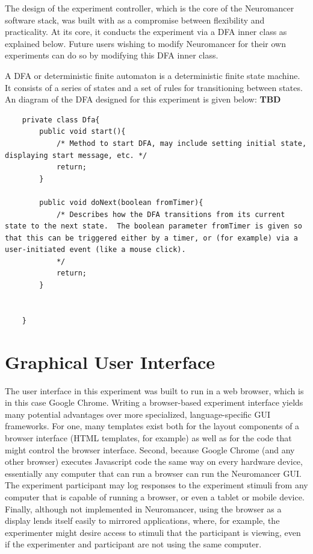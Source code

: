\documentclass[12pt]{report}
\begin{document}
The design of the experiment controller, which is the core of the Neuromancer software stack, was built with as a compromise between flexibility and practicality.  At its core, it conducts the experiment via a DFA inner class as explained below.  Future users wishing to modify Neuromancer for their own experiments can do so by modifying this DFA inner class.  

A DFA or deterministic finite automaton is a deterministic finite state machine.  It consists of a series of states and a set of rules for transitioning between states.  An diagram of the DFA designed for this experiment is given below: {\bf TBD}

\begin{lstlisting}
	private class Dfa{
		public void start(){
			/* Method to start DFA, may include setting initial state, displaying start message, etc. */
			return;
		}
		
		public void doNext(boolean fromTimer){
			/* Describes how the DFA transitions from its current state to the next state.  The boolean parameter fromTimer is given so that this can be triggered either by a timer, or (for example) via a user-initiated event (like a mouse click).
			*/
			return;
		}
		
		
	}
\end{lstlisting}

\section{Graphical User Interface}
	The user interface in this experiment was built to run in a web browser, which is in this case Google Chrome.  Writing a browser-based experiment interface yields many potential advantages over more specialized, language-specific GUI frameworks.  For one, many templates exist both for the layout components of a browser interface (HTML templates, for example) as well as for the code that might control the browser interface.  Second, because Google Chrome (and any other browser) executes Javascript code the same way on every hardware device, essentially any computer that can run a browser can run the Neuromancer GUI.  The experiment participant may log responses to the experiment stimuli from any computer that is capable of running a browser, or even a tablet or mobile device.  Finally, although not implemented in Neuromancer, using the browser as a display lends itself easily to mirrored applications, where, for example, the experimenter might desire access to stimuli that the participant is viewing, even if the experimenter and participant are not using the same computer.
\end{document}
